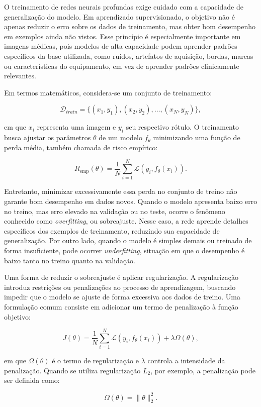 \documentclass[
    12pt,
    openright,
    oneside,
    a4paper,
    english,
    brazil
]{abntex2}
\begin{document}
O treinamento de redes neurais profundas exige cuidado com a capacidade de generalização do modelo. Em aprendizado supervisionado, o objetivo não é apenas reduzir o erro sobre os dados de treinamento, mas obter bom desempenho em exemplos ainda não vistos. Esse princípio é especialmente importante em imagens médicas, pois modelos de alta capacidade podem aprender padrões específicos da base utilizada, como ruídos, artefatos de aquisição, bordas, marcas ou características do equipamento, em vez de aprender padrões clinicamente relevantes.

Em termos matemáticos, considera-se um conjunto de treinamento:

\[
\mathcal{D}_{train} = \{(x_1,y_1),(x_2,y_2),\ldots,(x_N,y_N)\},
\]

em que \(x_i\) representa uma imagem e \(y_i\) seu respectivo rótulo. O treinamento busca ajustar os parâmetros \(\theta\) de um modelo \(f_{\theta}\) minimizando uma função de perda média, também chamada de risco empírico:

\[
R_{\text{emp}}(\theta) =
\frac{1}{N}
\sum_{i=1}^{N}
\mathcal{L}(y_i, f_{\theta}(x_i)).
\]

Entretanto, minimizar excessivamente essa perda no conjunto de treino não garante bom desempenho em dados novos. Quando o modelo apresenta baixo erro no treino, mas erro elevado na validação ou no teste, ocorre o fenômeno conhecido como \textit{overfitting}, ou sobreajuste. Nesse caso, a rede aprende detalhes específicos dos exemplos de treinamento, reduzindo sua capacidade de generalização. Por outro lado, quando o modelo é simples demais ou treinado de forma insuficiente, pode ocorrer \textit{underfitting}, situação em que o desempenho é baixo tanto no treino quanto na validação.

Uma forma de reduzir o sobreajuste é aplicar regularização. A regularização introduz restrições ou penalizações ao processo de aprendizagem, buscando impedir que o modelo se ajuste de forma excessiva aos dados de treino. Uma formulação comum consiste em adicionar um termo de penalização à função objetivo:

\[
J(\theta) =
\frac{1}{N}
\sum_{i=1}^{N}
\mathcal{L}(y_i, f_{\theta}(x_i))
+
\lambda \Omega(\theta),
\]

em que \(\Omega(\theta)\) é o termo de regularização e \(\lambda\) controla a intensidade da penalização. Quando se utiliza regularização \(L_2\), por exemplo, a penalização pode ser definida como:

\[
\Omega(\theta) = \|\theta\|_2^2.
\]
\end{document}
